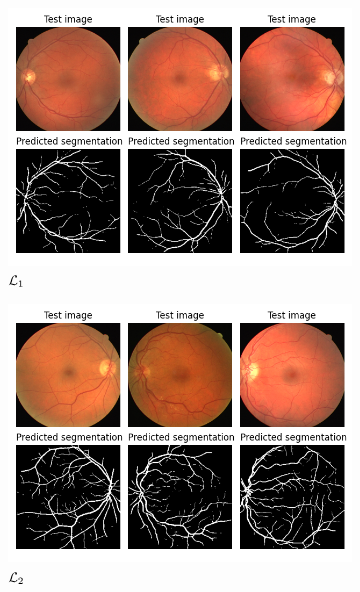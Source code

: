 \documentclass[onecolumn]{article}
\begin{document}
\begin{figure}[H]
    \centering
    \begin{subfigure}{0.45\textwidth}
        \includegraphics[width=\textwidth]{figures/result_on_test.png}
    \caption{$\mathcal{L}_1$}
    \end{subfigure}
    \begin{subfigure}{0.45\textwidth}
        \includegraphics[width=\textwidth]{figures/results_on_testGDL.png}
    \caption{$\mathcal{L}_2$}
    \end{subfigure}
    \begin{subfigure}{0.45\textwidth}

\end{subfigure}
\end{figure}
\end{document}
